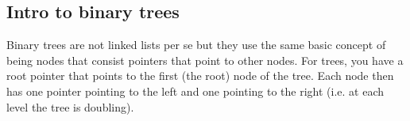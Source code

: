 \subsection{Intro to binary trees}
Binary trees are not linked lists per se but they use the same basic concept of being
nodes that consist pointers that point to other nodes. For trees, you have a root pointer
that points to the first (the root) node of the tree. Each node then has one pointer pointing to
the left and one pointing to the right (i.e. at each level the tree is doubling).













